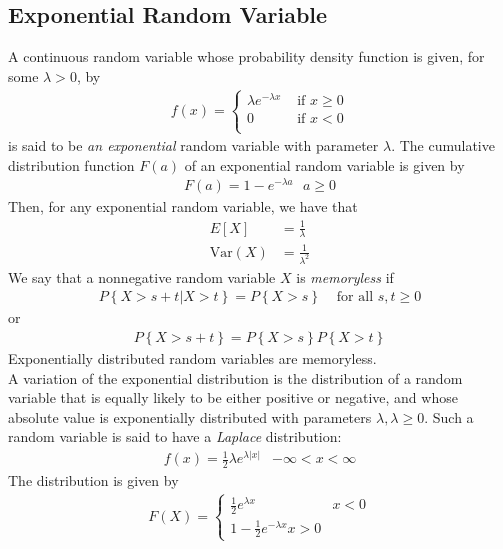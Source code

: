 \documentclass[a4paper]{article}
\begin{document}
\subsection{Exponential Random Variable} %
\label{sub:Exponential Random Variable}
A continuous random variable whose probability density function is given, for some $\lambda > 0$, by
\begin{align}
  f(x) =
  \begin{cases}
    \lambda e^{-\lambda x} & \text{ if } x \geq 0 \\
    0 & \text{ if } x < 0 \\
  \end{cases}
\end{align}
is said to be \emph{an exponential} random variable with parameter $\lambda$. The cumulative distribution function $F(a)$ of an exponential random variable is given by
\begin{align}
  F(a) = 1- e^{-\lambda a} \text{    } a \geq 0
\end{align}
Then, for any exponential random variable, we have that
\begin{align}
  E[X] & = \frac{1}{\lambda} \\
  \text{Var}(X) & = \frac{1}{\lambda^2}
\end{align}
We say that a nonnegative random variable $X$ is \emph{ memoryless} if
\begin{align}
  P\left\{ X>s+t | X > t \right\} = P\left\{ X > s \right\} & \text{ for all } s,t \geq 0
\end{align}
or
\begin{align}
  P\left\{ X > s+t \right\} = P\left\{ X>s \right\}P\left\{ X>t \right\}
\end{align}
Exponentially distributed random variables are memoryless. \\
A variation of the exponential distribution is the distribution of a random variable that is equally likely to be either positive or negative, and whose absolute value is exponentially distributed with parameters $\lambda,\lambda \geq 0$. Such a random variable is said to have a \emph{Laplace} distribution:
\begin{align}
  f(x) = \frac{1}{2} \lambda e^{\lambda |x|} & -\infty < x < \infty
\end{align}
The distribution is given by
\begin{align}
  F(X) = 
  \begin{cases}
    \frac{1}{2}e^{\lambda x} & x < 0 \\
    1- \frac{1}{2}e^{-\lambda x} x > 0
  \end{cases}
\end{align}
\end{document}
